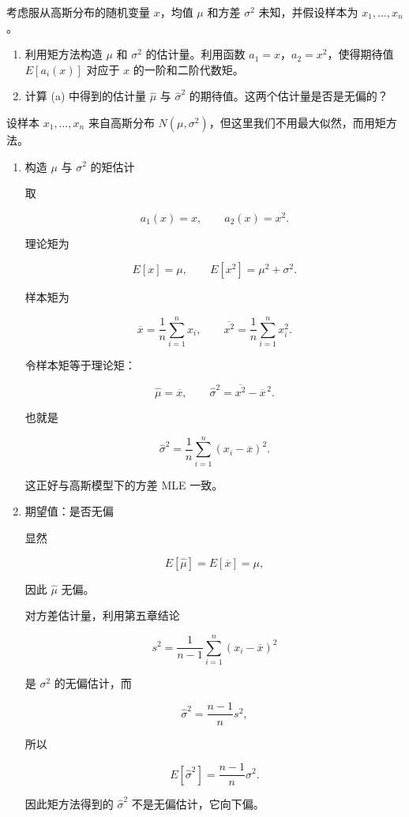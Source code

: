 ﻿





\begin{question}
考虑服从高斯分布的随机变量 \(x\)，均值 \(\mu\) 和方差 \(\sigma^2\)
未知，并假设样本为 \(x_1,\ldots,x_n\)。

\begin{enumerate}
\item
  利用矩方法构造 \(\mu\) 和 \(\sigma^2\) 的估计量。利用函数
  \(a_1=x\)，\(a_2=x^2\)，使得期待值 \(E[a_i(x)]\) 对应于 \(x\)
  的一阶和二阶代数矩。
\item
  计算 (a) 中得到的估计量 \(\hat\mu\) 与 \(\hat\sigma^2\)
  的期待值。这两个估计量是否是无偏的？
\end{enumerate}
\begin{solution}
设样本 \(x_1,\dots,x_n\) 来自高斯分布
\(N(\mu,\sigma^2)\)，但这里我们不用最大似然，而用矩方法。

\begin{enumerate}
\item 构造 \(\mu\) 与 \(\sigma^2\) 的矩估计

取

\[
a_1(x)=x,
\qquad
a_2(x)=x^2.
\]

理论矩为

\[
E[x]=\mu,
\qquad E[x^2]=\mu^2+\sigma^2.
\]

样本矩为

\[
\overline x=\frac1n\sum_{i=1}^n x_i,
\qquad
\overline{x^2}=\frac1n\sum_{i=1}^n x_i^2.
\]

令样本矩等于理论矩：

\[
\hat\mu=\overline x,
\qquad
\hat\sigma^2=\overline{x^2}-\overline x^{\,2}.
\]

也就是

\[
\hat\sigma^2=\frac1n\sum_{i=1}^n (x_i-\overline x)^2.
\]

这正好与高斯模型下的方差 MLE 一致。

\item 期望值：是否无偏

显然

\[
E[\hat\mu]=E[\overline x]=\mu,
\]

因此 \(\hat\mu\) 无偏。

对方差估计量，利用第五章结论

\[
s^2=\frac1{n-1}\sum_{i=1}^n (x_i-\overline x)^2
\]

是 \(\sigma^2\) 的无偏估计，而

\[
\hat\sigma^2=\frac{n-1}{n}s^2,
\]

所以

\[
E[\hat\sigma^2]=\frac{n-1}{n}\sigma^2.
\]

因此矩方法得到的 \(\hat\sigma^2\) 不是无偏估计，它向下偏。
\end{enumerate}
\end{solution}
\end{question}



